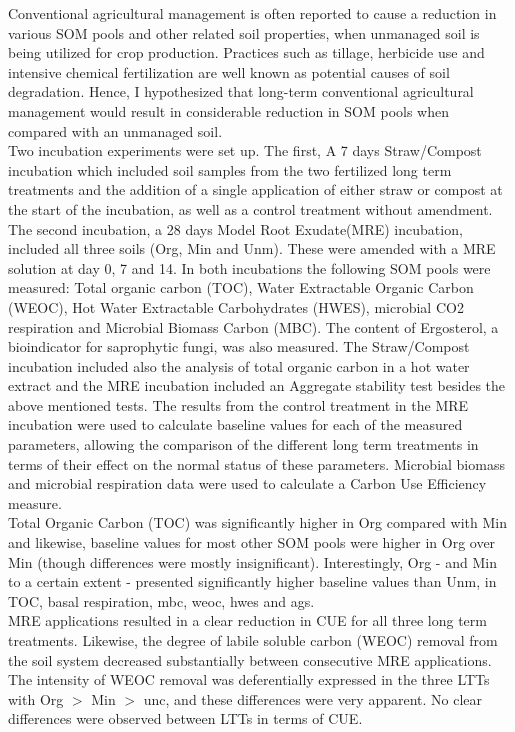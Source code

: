 	Conventional agricultural management is often reported to cause a reduction in various SOM pools and other related soil properties, when unmanaged soil is being utilized for crop production. Practices such as tillage, herbicide use and intensive chemical fertilization are well known as potential causes of soil degradation. Hence, I hypothesized that long-term conventional agricultural management would result in considerable reduction in SOM pools when compared with an unmanaged soil.\\
	Two incubation experiments were set up. The first, A 7 days Straw/Compost incubation which included soil samples from the two fertilized long term treatments and the addition of a single application of either straw or compost at the start of the incubation, as well as a control treatment without amendment. The second incubation, a 28 days Model Root Exudate(MRE) incubation, included all three soils (Org, Min and Unm). These were amended with a MRE solution at day 0, 7 and 14. In both incubations the following SOM pools were measured: Total organic carbon (TOC), Water Extractable Organic Carbon (WEOC), Hot Water Extractable Carbohydrates (HWES), microbial CO2 respiration and Microbial Biomass Carbon (MBC). The content of Ergosterol, a bioindicator for saprophytic fungi, was also measured. The Straw/Compost incubation included also the analysis of total organic carbon in a hot water extract and the MRE incubation included an Aggregate stability test besides the above mentioned tests.  The results from the control treatment in the MRE incubation were used to calculate baseline values for each of the measured parameters, allowing the comparison of the different long term treatments in terms of their effect on the normal status of these parameters. Microbial biomass and microbial respiration data were used to calculate a Carbon Use Efficiency measure.\\
	Total Organic Carbon (TOC) was significantly higher in Org compared with Min and likewise, baseline values  for most other SOM pools were higher in Org over Min (though differences were mostly insignificant). Interestingly, Org - and Min to a certain extent - presented significantly higher baseline values than Unm, in TOC, basal respiration, \gls{mbc}, \gls{weoc}, \gls{hwes} and \gls{ags}.\\ 
	MRE applications resulted in a clear reduction in CUE for all three long term treatments. Likewise, the degree of labile soluble carbon (WEOC) removal from the soil system decreased substantially between consecutive MRE applications. The intensity of WEOC removal was deferentially expressed in the three LTTs with Org $  > $ Min $ > $ \gls{unc}, and these differences were very apparent. No clear differences were observed between LTTs in terms of CUE.\\
